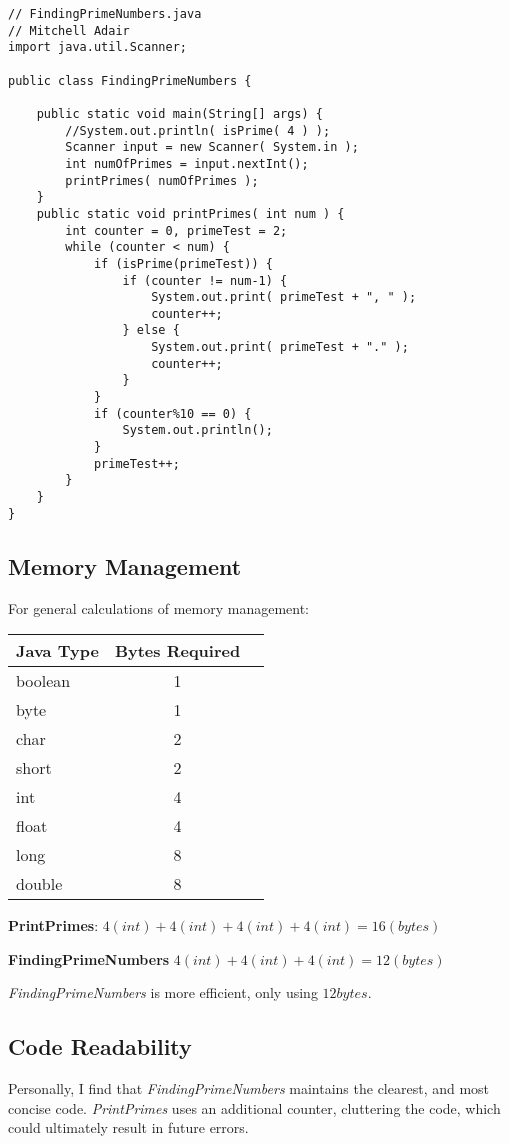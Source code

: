 \documentclass[12pt]{article}
\begin{document}
\begin{lstlisting}
// FindingPrimeNumbers.java
// Mitchell Adair
import java.util.Scanner;

public class FindingPrimeNumbers {

	public static void main(String[] args) {
		//System.out.println( isPrime( 4 ) );
		Scanner input = new Scanner( System.in );
		int numOfPrimes = input.nextInt();
		printPrimes( numOfPrimes );
	}
	public static void printPrimes( int num ) {
		int counter = 0, primeTest = 2;
		while (counter < num) {
			if (isPrime(primeTest)) {
				if (counter != num-1) {
					System.out.print( primeTest + ", " );
					counter++;
				} else {
					System.out.print( primeTest + "." );
					counter++;
				}
			}
			if (counter%10 == 0) {
				System.out.println();
			}
			primeTest++;
		}
	}
}
\end{lstlisting}
\newpage
\subsection{Memory Management}
For general calculations of memory management: 

\begin{center}
\begin{tabular}{l c r}
Java Type & Bytes Required \\ \hline \hline
boolean & 1 \\
byte & 1 \\ \hline
char & 2 \\
short & 2 \\ \hline
int & 4 \\
float & 4 \\ \hline
long & 8 \\
double & 8\\
\end{tabular}
\end{center}

\textbf{PrintPrimes}: $4(int) + 4(int) + 4(int) + 4(int) = 16(bytes)$

\textbf{FindingPrimeNumbers} $4(int) + 4(int) + 4(int) = 12(bytes)$ 

\textit{FindingPrimeNumbers} is more efficient, only using $12 bytes$.  
\subsection{Code Readability}
Personally, I find that \textit{FindingPrimeNumbers} maintains the clearest, and most concise code.  \textit{PrintPrimes} uses an additional counter, cluttering the code, which could ultimately result in future errors.
\end{document}
